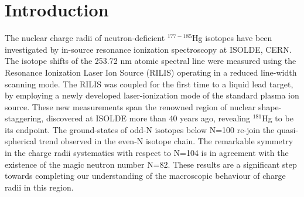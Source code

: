 \section{Introduction}
The nuclear charge radii of neutron-deficient $^{177-185}$Hg isotopes have been investigated by in-source resonance ionization spectroscopy at ISOLDE, CERN.  The isotope shifts of the 253.72 nm atomic spectral line were measured using the Resonance Ionization Laser Ion Source (RILIS) operating in a reduced line-width scanning mode.  The RILIS was coupled for the first time to a liquid lead target, by employing a newly developed laser-ionization mode of the standard plasma ion source. These new measurements span the renowned region of nuclear shape-staggering, discovered at ISOLDE more than 40 years ago, revealing $^{181}$Hg to be its endpoint. The ground-states of odd-N isotopes below N=100 re-join the quasi-spherical trend observed in the even-N isotope chain.  The remarkable symmetry in the charge radii systematics with respect to N=104 is in agreement with the existence of the magic neutron number N=82. These results are a significant step towards completing our understanding of the macroscopic behaviour of charge radii in this region.